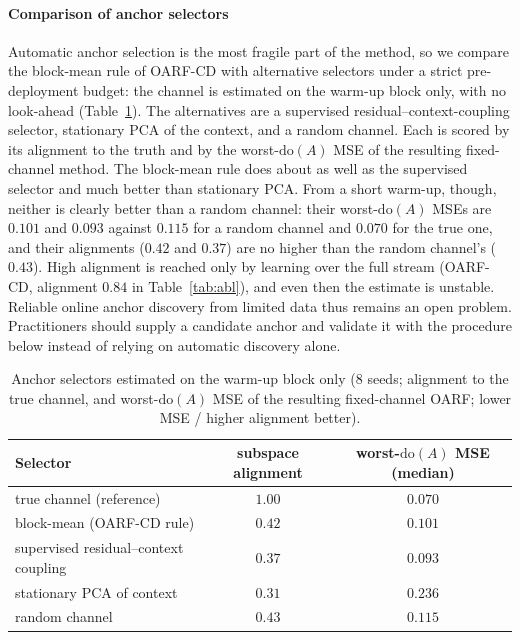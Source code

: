 \documentclass[authoryear,preprint,12pt]{elsarticle}
\theoremstyle{plain}
\theoremstyle{remark}
\newcommand{\doop}{\mathrm{do}}
\newcommand{\OARF}{\textsc{OARF}}
\newcommand{\OARFCD}{\textsc{OARF-CD}}
\begin{document}
\paragraph{Comparison of anchor selectors}
Automatic anchor selection is the most fragile part of the method, so we compare the
block-mean rule of OARF-CD with alternative selectors under a strict pre-deployment
budget: the channel is estimated on the warm-up block only, with no look-ahead
(Table~\ref{tab:sel}). The alternatives are a supervised residual--context-coupling
selector, stationary PCA of the context, and a random channel. Each is scored by its
alignment to the truth and by the worst-$\doop(A)$ MSE of the resulting fixed-channel
method. The block-mean rule does about as well as the supervised selector and much better than stationary PCA. From a short warm-up, though, neither is clearly better than a random channel: their worst-$\doop(A)$ MSEs are $0.101$ and $0.093$ against $0.115$ for a random channel and $0.070$ for the true one, and their alignments ($0.42$ and $0.37$) are no higher than the random channel's ($0.43$). High alignment is reached only by learning over the full stream (\OARFCD{}, alignment $0.84$ in Table~\ref{tab:abl}), and even then the estimate is unstable.
Reliable online anchor discovery from limited data thus remains an open problem.
Practitioners should supply a candidate anchor and validate it with the procedure
below instead of relying on automatic discovery alone.

\begin{table}[htbp]
\centering
\caption{Anchor selectors estimated on the warm-up block only (8 seeds; alignment to
the true channel, and worst-$\doop(A)$ MSE of the resulting fixed-channel \OARF{};
lower MSE / higher alignment better).}
\label{tab:sel}
\small
\begin{tabular}{lcc}
\toprule
Selector & subspace alignment & worst-$\doop(A)$ MSE (median)\\
\midrule
true channel (reference)             & $1.00$ & $0.070$\\
block-mean (OARF-CD rule)            & $0.42$ & $0.101$\\
supervised residual--context coupling & $0.37$ & $0.093$\\
stationary PCA of context            & $0.31$ & $0.236$\\
random channel                       & $0.43$ & $0.115$\\
\bottomrule
\end{tabular}
\end{table}
\end{document}
